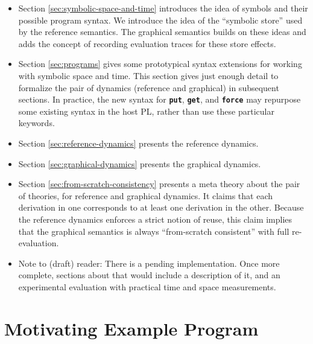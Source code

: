 \documentclass[11pt]{article}
\renewcommand{\ottkw}[1]{\textbf{\texttt{#1}}}
\begin{document}
\begin{itemize}

\item Section \ref{sec:symbolic-space-and-time} introduces the idea of symbols and their possible program syntax.  We introduce the idea of the ``symbolic store'' used by the reference semantics.  The graphical semantics builds on these ideas and adds the concept of recording evaluation traces for these store effects.
  
\item Section \ref{sec:programs} gives some prototypical syntax
  extensions for working with symbolic space and time.
  This section gives just enough detail to
  formalize the pair of dynamics (reference and graphical) in
  subsequent sections.
  In practice,
  the new syntax for \ottkw{put}, \ottkw{get}, and \ottkw{force} may
  repurpose some existing syntax in the host PL, rather than use these
  particular keywords.  

\item Section \ref{sec:reference-dynamics} presents the reference dynamics.

\item Section \ref{sec:graphical-dynamics} presents the graphical dynamics.

\item Section \ref{sec:from-scratch-consistency} presents a meta theory
  about the pair of theories, for reference and graphical dynamics.
  It claims that each derivation in one corresponds
  to at least one derivation in the other.  Because the reference
  dynamics enforces a strict notion of reuse, this claim implies that
  the graphical semantics is always ``from-scratch consistent'' with
  full re-evaluation.

\item Note to (draft) reader: There is a pending implementation.  Once more
  complete, sections about that would include a description of it, and
  an experimental evaluation with practical time and space
  measurements.
  
\end{itemize}

\section{Motivating Example Program}
\end{document}
